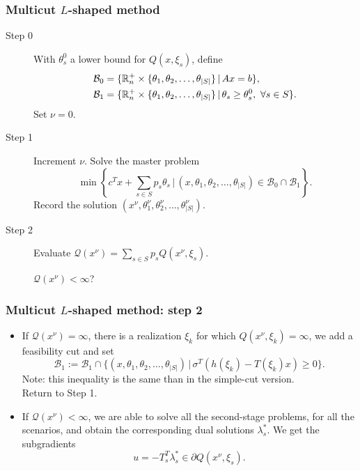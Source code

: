 \documentclass{beamer}
\begin{document}
\begin{frame}
\frametitle{Multicut $L$-shaped method}
	
\begin{description}
\item[Step 0]
With $\theta_s^0$ a lower bound for $Q(x, \xi_s)$, define
\begin{align*}
\mathcal{B}_0 &= \lbrace \mathbb{R}_n^+ \times \lbrace \theta_1,
\theta_2,\ldots, \theta_{|S|}\rbrace \,|\, Ax = b \rbrace, \\
\mathcal{B}_1 &= \lbrace \mathbb{R}_n^+ \times \lbrace \theta_1,
\theta_2,\ldots, \theta_{|S|}\rbrace \,|\, \theta_s \geq \theta_s^0,\
\forall s \in S \rbrace.
\end{align*}
Set $\nu = 0$.
\item[Step 1]
Increment $\nu$.
Solve the master problem
\[
\min \left\lbrace c^Tx+\sum_{s \in S} p_s\theta_s \,|\,
(x,\theta_1,\theta_2,\ldots,\theta_{|S|}) \in \mathcal{B}_0 \cap \mathcal{B}_1 \right\rbrace.
\]
Record the solution $( x^{\nu}, \theta_1^{\nu}, \theta_2^{\nu},\ldots,
\theta_{|S|}^{\nu} )$.
\item[Step 2]
Evaluate $\mathcal{Q}(x^{\nu}) = \sum_{s \in S} p_s Q(x^{\nu}, \xi_s)$.
		
		$\mathcal{Q}(x^{\nu}) < \infty$?
\end{description}
	
\end{frame}

\begin{frame}
\frametitle{Multicut $L$-shaped method: step 2}
	
\begin{itemize}
\item
If $\mathcal{Q}(x^{\nu}) = \infty$, there is a realization $\xi_k$ for which $Q(x^{\nu}, \xi_k) = \infty$, we add a feasibility cut and set
\[
\mathcal{B}_1 := \mathcal{B}_1 \cap \lbrace
(x,\theta_1,\theta_2,\ldots,\theta_{|S|}) \,|\, \sigma^T(h(\xi_k) -
T(\xi_k)x) \geq 0\rbrace.
\]
Note: this inequality is the same than in the simple-cut version.\\
Return to Step 1.
\item
If $\mathcal{Q}(x^{\nu}) < \infty$, we are able to solve all the second-stage problems, for all the scenarios, and obtain the corresponding dual solutions $\lambda_s^*$.
We get the subgradients
\[
u = -T_s^T\lambda_s^* \in \partial Q(x^{\nu}, \xi_s).
\]
\end{itemize}
	
\end{frame}
\end{document}
